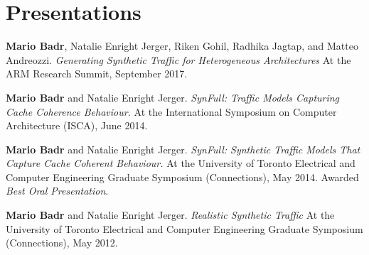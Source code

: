 \section{\sc Presentations}

\onecol
{
  \textbf{Mario Badr}, Natalie Enright Jerger, Riken Gohil, Radhika Jagtap, and Matteo Andreozzi.
  \textit{Generating Synthetic Traffic for Heterogeneous Architectures}
  At the ARM Research Summit, September 2017.
}

\onecol
{
  \textbf{Mario Badr} and Natalie Enright Jerger.
  \textit{SynFull: Traffic Models Capturing Cache Coherence Behaviour.}
  At the International Symposium on Computer Architecture (ISCA), June 2014.
}

\onecol
{
  \textbf{Mario Badr} and Natalie Enright Jerger.
  \textit{SynFull: Synthetic Traffic Models That Capture Cache Coherent Behaviour.}
  At the University of Toronto Electrical and Computer Engineering Graduate Symposium (Connections), May 2014.
  Awarded \textit{Best Oral Presentation}.
}

\onecol
{
  \textbf{Mario Badr} and Natalie Enright Jerger.
  \textit{Realistic Synthetic Traffic}
  At the University of Toronto Electrical and Computer Engineering Graduate Symposium (Connections), May 2012.
}
